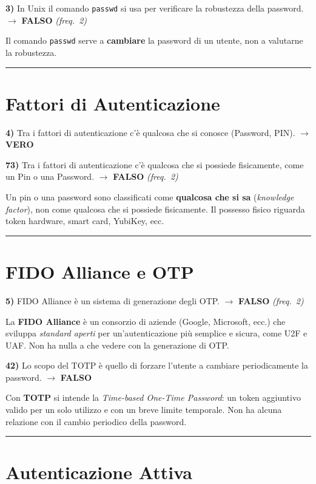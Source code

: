 \documentclass[12pt, a4paper]{report}
\newcommand{\vero}{\textcolor{verdeanswer}{\textbf{VERO}}}
\newcommand{\falso}{\textcolor{rossoanswer}{\textbf{FALSO}}}
\newcommand{\freq}[1]{\textcolor{freqcolor}{\textit{(freq.\ #1)}}}
\begin{document}
\noindent\textbf{3)} In Unix il comando \texttt{passwd} si usa per verificare la robustezza della password. $\to$ \falso{} \freq{2}

\medskip
\noindent Il comando \texttt{passwd} serve a \textbf{cambiare} la password di un utente, non a valutarne la robustezza.

\noindent\rule{\textwidth}{0.4pt}

\section{Fattori di Autenticazione}

\noindent\textbf{4)} Tra i fattori di autenticazione c'è qualcosa che si conosce (Password, PIN). $\to$ \vero{}

\medskip
\noindent\textbf{73)} Tra i fattori di autenticazione c'è qualcosa che si possiede fisicamente, come un Pin o una Password. $\to$ \falso{} \freq{2}

\medskip
\noindent Un pin o una password sono classificati come \textbf{qualcosa che si sa} (\textit{knowledge factor}), non come qualcosa che si possiede fisicamente. Il possesso fisico riguarda token hardware, smart card, YubiKey, ecc.

\noindent\rule{\textwidth}{0.4pt}

\section{FIDO Alliance e OTP}

\noindent\textbf{5)} FIDO Alliance è un sistema di generazione degli OTP. $\to$ \falso{} \freq{2}

\medskip
\noindent La \textbf{FIDO Alliance} è un consorzio di aziende (Google, Microsoft, ecc.) che sviluppa \textit{standard aperti} per un'autenticazione più semplice e sicura, come U2F e UAF. Non ha nulla a che vedere con la generazione di OTP.

\medskip
\noindent\textbf{42)} Lo scopo del TOTP è quello di forzare l'utente a cambiare periodicamente la password. $\to$ \falso{}

\medskip
\noindent Con \textbf{TOTP} si intende la \textit{Time-based One-Time Password}: un token aggiuntivo valido per un solo utilizzo e con un breve limite temporale. Non ha alcuna relazione con il cambio periodico della password.

\noindent\rule{\textwidth}{0.4pt}

\section{Autenticazione Attiva}
\end{document}
